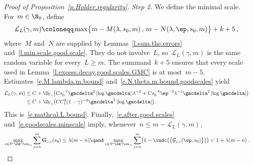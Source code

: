 \documentclass[11pt]{amsart}
\begin{document}
\begin{proof}[{Proof of Proposition~\ref{p.Holder.regularity}}]
\emph{Step 2.} We define the minimal scale. For~$m\in\N_0$, define
\begin{equation}
	\mathcal{L}_L(\gamma,m) \coloneqq
	\max\bigl\{ m - M(\lambda,s_0,m) \,,\, m - N(\lambda,\ep,s_0,m) \bigr\} + k + 5\,,
	\label{e.L.def.reg}
\end{equation}
where~$M$ and~$N$ are supplied by Lemmas~\ref{l.sum.the.errors} and~\ref{l.min.scale.good.scale}. They do not involve~$L$, so~$\mathcal L_L(\gamma,m)$ is the same random variable for every~$L\geq m$.  The summand~$k+5$ ensures that every scale used in Lemma~\ref{l.excess.decay.good.scales.GMC} is at most~$m-5$. Estimates~\eqref{e.M.lambda.m.bound} and~\eqref{e.N.theta.m.bound.goodscales} yield
\begin{align*}
	\mathcal L_L(\gamma,m)
	&\leq C+\O_{\Gamma_1}\bigl( Cs_0^{-7}\gmcdelta^2\left|\log\gmcdelta\right|\lambda^{-2}
	+ Cs_0^{-8}\ep^{-2}\lambda^{-1}\gmcdelta^2\left|\log\gmcdelta\right| \bigr)
	\notag \\ &
	\leq C+\O_{\Gamma_1}\bigl( CC_1^2(1-\gamma)^{-2}\gmcdelta^2\left|\log\gmcdelta\right| \bigr)\,.
\end{align*}
This is~\eqref{e.mathcal.L.bound}. Finally,~\eqref{e.after.good.scales} and~\eqref{e.goodscales.minscale} imply, whenever~$n\leq m-\mathcal L_L(\gamma,m)$,
\begin{equation}
	\max_{z\in 3^n\Zd\cap\cu_m} \sum_{j=n}^{m} \mathbf{G}_{j,z}(s_0) \leq \lambda(m-n)
	\qand
	\max_{z\in 3^n\Zd\cap\cu_m} \sum_{j=n}^{m}
	\bigl(1 - \indc{\bigl\{\mathcal{G}_{j,z}(\ep,s_0)\bigr\}}\bigr)
	<1+\lambda(m-n)\,.
	\label{e.after.good.scales.applied}
\end{equation}

\smallskip


\end{proof}
\end{document}
